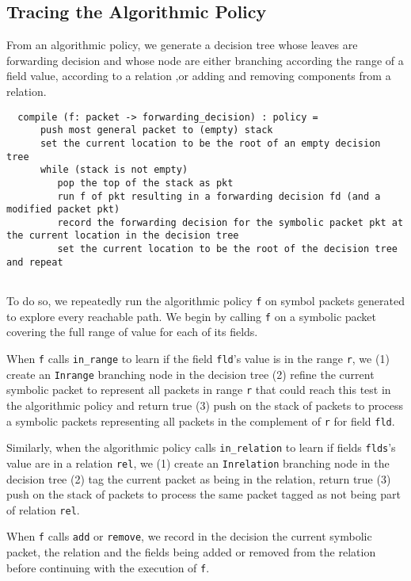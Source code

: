 \documentclass[12pt]{article}
\begin{document}
\subsection*{Tracing the Algorithmic Policy}
From an algorithmic policy, we generate a decision tree  whose leaves are forwarding decision and whose node are either branching according the range of a field value, according to a relation ,or adding and removing components from a relation.

\begin{lstlisting}
  compile (f: packet -> forwarding_decision) : policy =
      push most general packet to (empty) stack
      set the current location to be the root of an empty decision tree
      while (stack is not empty)
         pop the top of the stack as pkt
         run f of pkt resulting in a forwarding decision fd (and a modified packet pkt)
         record the forwarding decision for the symbolic packet pkt at the current location in the decision tree
         set the current location to be the root of the decision tree and repeat
  
\end{lstlisting}

To do so, we repeatedly run the algorithmic policy \lstinline|f| on symbol packets generated to explore every reachable path.
We begin by calling \lstinline|f| on a symbolic packet covering the full range of value for each of its fields.

When \lstinline|f| calls \lstinline|in_range| to learn if the field \lstinline|fld|'s value is in the range \lstinline|r|, we (1) create an \lstinline|Inrange| branching node in the decision tree (2) refine the current symbolic packet to represent all packets in range \lstinline|r| that could reach this test in the algorithmic policy and return true (3) push on the stack of packets to process a symbolic packets representing all packets in the complement of \lstinline|r| for field \lstinline|fld|.

Similarly, when the algorithmic policy calls \lstinline|in_relation| to learn if fields \lstinline|flds|'s value are in a relation \lstinline|rel|, we (1) create an \lstinline|Inrelation| branching node in the decision tree (2) tag the current packet as being in the relation, return true (3) push on the stack of packets to process the same packet tagged as not being part of relation \lstinline|rel|.

When \lstinline|f| calls \lstinline|add| or \lstinline|remove|, we record in the decision the current symbolic packet, the relation and the fields being added or removed from the relation before continuing with the execution of \lstinline|f|.
\end{document}
